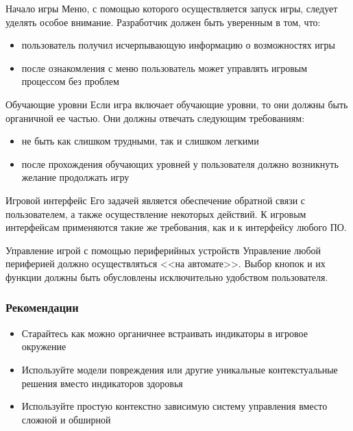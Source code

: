 \documentclass[10pt]{beamer}
\begin{document}
\begin{frame}

\begin{block}{Начало игры}
  Меню, с помощью которого осуществляется запуск игры, следует уделять особое внимание. Разработчик должен быть уверенным в том, что:
  \begin{itemize}
    \item пользователь получил исчерпывающую информацию о возможностях игры
    \item после ознакомления с меню пользователь может управлять игровым процессом без проблем
  \end{itemize}
\end{block}

\begin{block}{Обучающие уровни}
  Если игра включает обучающие уровни, то они должны быть органичной ее частью. Они должны отвечать следующим требованиям:
  \begin{itemize}
    \item не быть как слишком трудными, так и слишком легкими
    \item после прохождения обучающих уровней у пользователя должно возникнуть желание продолжать игру
  \end{itemize}
\end{block}

\end{frame}


\begin{frame}

\begin{block}{Игровой интерфейс}
  Его задачей является обеспечение обратной связи с пользователем, а также осуществление некоторых действий. К игровым интерфейсам применяются такие же требования, как и к интерфейсу любого ПО.
\end{block}

\begin{block}{Управление игрой с помощью периферийных устройств}
  Управление любой периферией должно осуществляться <<на автомате>>. Выбор кнопок и их функции должны быть обусловлены исключительно удобством пользователя.
\end{block}

\end{frame}

\begin{frame}
\frametitle{Рекомендации}

\begin{block}{}
  \begin{itemize}
    \item Старайтесь как можно органичнее встраивать индикаторы в игровое окружение
    \item Используйте модели повреждения или другие уникальные контекстуальные решения вместо индикаторов здоровья
    \item Используйте простую контекстно зависимую систему управления вместо сложной и обширной
  \end{itemize}
\end{block}

\end{frame}
\end{document}
